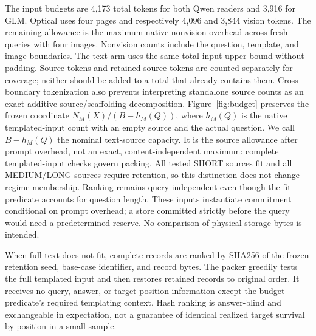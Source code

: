 The input budgets are 4,173 total tokens for both Qwen readers and 3,916 for GLM. Optical uses four pages and respectively 4,096 and 3,844 vision tokens. The remaining allowance is the maximum native nonvision overhead across fresh queries with four images. Nonvision counts include the question, template, and image boundaries. The text arm uses the same total-input upper bound without padding. Source tokens and retained-source tokens are counted separately for coverage; neither should be added to a total that already contains them. Cross-boundary tokenization also prevents interpreting standalone source counts as an exact additive source/scaffolding decomposition. Figure~\ref{fig:budget} preserves the frozen coordinate $N_M(X)/(B-h_M(Q))$, where $h_M(Q)$ is the native templated-input count with an empty source and the actual question. We call $B-h_M(Q)$ the nominal text-source capacity. It is the source allowance after prompt overhead, not an exact, content-independent maximum: complete templated-input checks govern packing. All tested SHORT sources fit and all MEDIUM/LONG sources require retention, so this distinction does not change regime membership. Ranking remains query-independent even though the fit predicate accounts for question length. These inputs instantiate commitment conditional on prompt overhead; a store committed strictly before the query would need a predetermined reserve. No comparison of physical storage bytes is intended.

When full text does not fit, complete records are ranked by SHA256 of the frozen retention seed, base-case identifier, and record bytes. The packer greedily tests the full templated input and then restores retained records to original order. It receives no query, answer, or target-position information except the budget predicate's required templating context. Hash ranking is answer-blind and exchangeable in expectation, not a guarantee of identical realized target survival by position in a small sample.

\begin{table}[ht]\centering\small
\caption{Fixed-budget diagnostics. Source/capacity is the mean native-source/nominal-text-source-capacity ratio. Differences are optical minus text. Target retained counts refer to the text condition out of 30; optical source coverage is complete.}

\end{table}

